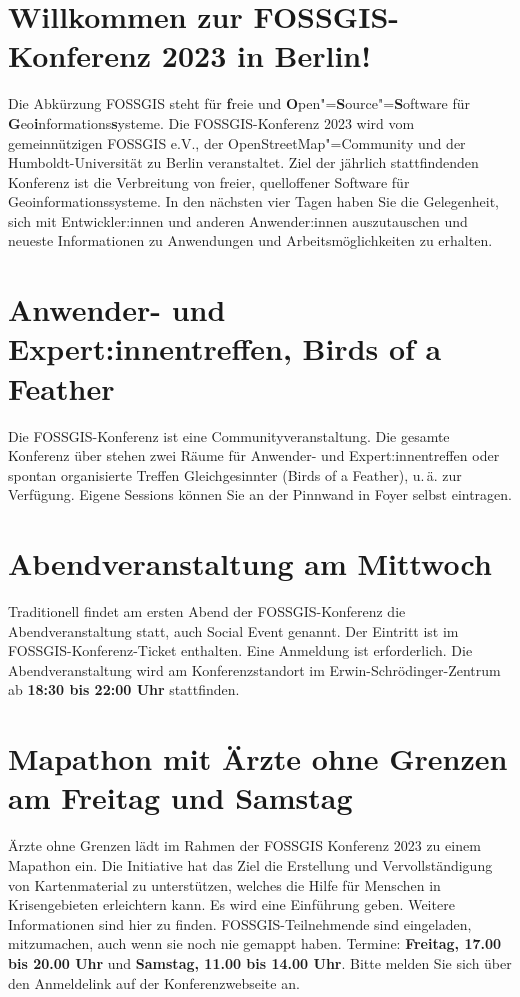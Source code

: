 \newpage
\section*{Willkommen zur FOSSGIS-Konferenz 2023 in Berlin!}\label{welcome}
Die Abkürzung { FOSSGIS} steht für {\bfseries f}reie und {\bfseries O}pen"={\bfseries S}ource"={\bfseries S}oftware für {\bfseries G}eo{\bfseries i}nformations{\bfseries s}ysteme.
Die FOSSGIS-Konferenz 2023 wird vom gemeinnützigen FOSSGIS e.V., der
OpenStreetMap"=Community und der Humboldt-Universität zu Berlin
veranstaltet.
Ziel der jährlich stattfindenden Konferenz ist die Verbreitung von freier,
quelloffener Software für Geoinformationssysteme. In den nächsten vier Tagen
haben Sie die Gelegenheit, sich mit Entwickler:innen und anderen Anwender:innen
auszutauschen und \mbox{neueste} Informationen zu Anwendungen und
Arbeitsmöglichkeiten zu erhalten.

\section*{Anwender- und Expert:innentreffen, Birds of a Feather}
Die FOSSGIS-Konferenz ist eine Communityveranstaltung.
Die gesamte Konferenz über stehen zwei Räume für Anwender- und Expert:innentreffen oder spontan organisierte
Treffen Gleichgesinnter (Birds of a Feather), u.\,ä.
zur Verfügung. Eigene Sessions können Sie an der Pinnwand in Foyer selbst eintragen.
\pagebreak

\section*{Abendveranstaltung am Mittwoch}\label{schwaetzli}
Traditionell findet am ersten Abend der FOSSGIS-Konferenz die
Abendveranstaltung statt, auch Social Event genannt. Der Eintritt
ist im FOSSGIS-Konferenz-Ticket enthalten. Eine Anmeldung ist erforderlich.
Die Abendveranstaltung wird am Konferenzstandort im Erwin-Schrödinger-Zentrum
ab {\bfseries 18:30 bis 22:00 Uhr} stattfinden.

\section*{Mapathon mit Ärzte ohne Grenzen am Freitag und Samstag}
Ärzte ohne Grenzen lädt im Rahmen der FOSSGIS Konferenz 2023 zu einem Mapathon ein. Die Initiative hat das Ziel die Erstellung und Vervollständigung von Kartenmaterial zu unterstützen, welches die Hilfe für Menschen in Krisengebieten erleichtern kann. Es wird eine Einführung geben. Weitere Informationen sind hier zu finden. FOSSGIS-Teilnehmende sind eingeladen, mitzumachen, auch wenn sie noch nie gemappt haben.
Termine: {\bfseries Freitag, 17.00 bis 20.00 Uhr} und {\bfseries Samstag, 11.00 bis 14.00 Uhr}. Bitte melden Sie sich über den Anmeldelink auf der Konferenzwebseite an.
\pagebreak

